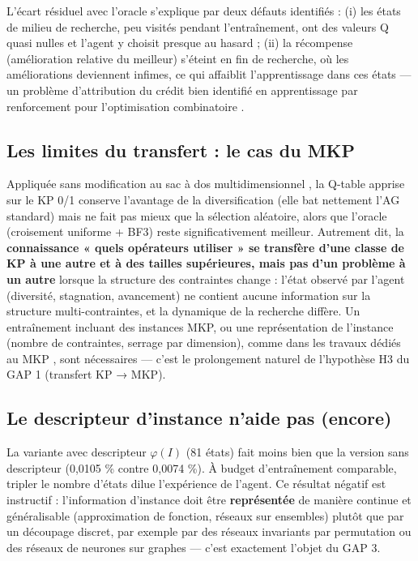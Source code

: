 \documentclass[
  french,
  11pt,
  a4paper,
]{article}
\begin{document}
L'écart résiduel avec l'oracle s'explique par deux défauts identifiés :
(i) les états de milieu de recherche, peu visités pendant
l'entraînement, ont des valeurs Q quasi nulles et l'agent y choisit
presque au hasard ; (ii) la récompense (amélioration relative du
meilleur) s'éteint en fin de recherche, où les améliorations deviennent
infimes, ce qui affaiblit l'apprentissage dans ces états --- un problème
d'attribution du crédit bien identifié en apprentissage par renforcement
pour l'optimisation combinatoire \autocite{yan_deep_2022}.

\subsection{Les limites du transfert : le cas du
MKP}\label{discussion-les-limites-du-transfert-le-cas-du-mkp}

Appliquée sans modification au sac à dos multidimensionnel
\autocite{kellerer_multidimensional_2004,chu_beasley_1998}, la Q-table
apprise sur le KP 0/1 conserve l'avantage de la diversification (elle
bat nettement l'AG standard) mais ne fait pas mieux que la sélection
aléatoire, alors que l'oracle (croisement uniforme + BF3) reste
significativement meilleur. Autrement dit, la \textbf{connaissance «
quels opérateurs utiliser » se transfère d'une classe de KP à une autre
et à des tailles supérieures, mais pas d'un problème à un autre} lorsque
la structure des contraintes change : l'état observé par l'agent
(diversité, stagnation, avancement) ne contient aucune information sur
la structure multi-contraintes, et la dynamique de la recherche diffère.
Un entraînement incluant des instances MKP, ou une représentation de
l'instance (nombre de contraintes, serrage par dimension), comme dans
les travaux dédiés au MKP
\autocite{bushaj_k-means_2024,ozsoydan_reinforcement_2023}, sont
nécessaires --- c'est le prolongement naturel de l'hypothèse H3 du GAP 1
(transfert KP → MKP).

\subsection{Le descripteur d'instance n'aide pas
(encore)}\label{discussion-le-descripteur-dinstance-naide-pas-encore}

La variante avec descripteur \(\varphi(I)\) (81 états) fait moins bien
que la version sans descripteur (0,0105 \% contre 0,0074 \%). À budget
d'entraînement comparable, tripler le nombre d'états dilue l'expérience
de l'agent. Ce résultat négatif est instructif : l'information
d'instance doit être \textbf{représentée} de manière continue et
généralisable (approximation de fonction, réseaux sur ensembles) plutôt
que par un découpage discret, par exemple par des réseaux invariants par
permutation \autocite{lee_settransformer_2019} ou des réseaux de
neurones sur graphes \autocite{khalil_2017} --- c'est exactement l'objet
du GAP 3.
\end{document}
